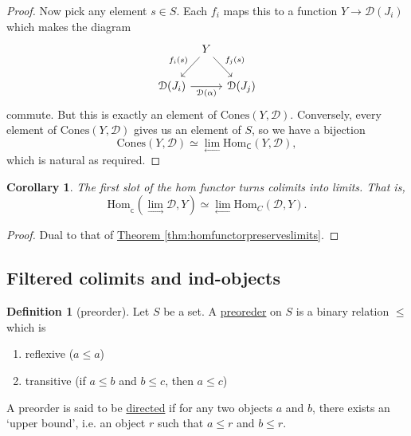 \documentclass[a4paper]{report}
\newcommand{\defn}[1]{\ul{#1}}
\newcommand{\Hom}{\mathrm{Hom}}
\theoremstyle{definition}
\newtheorem{definition}{Definition}[section]
\theoremstyle{plain}
\newtheorem{corollary}{Corollary}[section]
\theoremstyle{remark}
\begin{document}
\begin{proof}
  Now pick any element $s \in S$. Each $f_{i}$ maps this to a function $Y \to \mathcal{D}(J_{i})$ which makes the diagram
  \begin{equation*}
    \begin{tikzcd}[column sep=tiny]
      & Y
      \arrow[dl, swap, "f_{i}(s)"]
      \arrow[dr, "f_{j}(s)"]
      \\
      \mathcal{D}(J_{i})
      \arrow[rr, swap, "\mathcal{D}(\alpha)"]
      & & \mathcal{D}(J_{j})
    \end{tikzcd}
  \end{equation*}
  commute. But this is exactly an element of $\mathrm{Cones}(Y, \mathcal{D})$. Conversely, every element of $\mathrm{Cones}(Y, \mathcal{D})$ gives us an element of $S$, so we have a bijection 
  \begin{equation*}
    \mathrm{Cones}(Y, \mathcal{D}) \simeq \lim_{\leftarrow} \Hom_{\mathsf{C}}(Y, \mathcal{D}),
  \end{equation*}
  which is natural as required.
\end{proof}

\begin{corollary}
  The first slot of the hom functor turns colimits into limits. That is, 
  \begin{equation*}
    \Hom_{_\mathsf{C}}(\lim_{\rightarrow}\mathcal{D}, Y) \simeq \lim_{\leftarrow}\Hom_{C}(\mathcal{D}, Y).
  \end{equation*}
\end{corollary}
\begin{proof}
  Dual to that of \hyperref[thm:homfunctorpreserveslimits]{Theorem \ref*{thm:homfunctorpreserveslimits}}.
\end{proof}


\subsection{Filtered colimits and ind-objects}
\begin{definition}[preorder]
  \label{def:preorder}
  Let $S$ be a set. A \defn{preoreder} on $S$ is a binary relation $\leq$ which is 
  \begin{enumerate}
    \item reflexive ($a \leq a$)

    \item transitive (if $a \leq b$ and $b \leq c$, then $a \leq c$)
  \end{enumerate}

  A preorder is said to be \defn{directed} if for any two objects $a$ and $b$, there exists an `upper bound', i.e. an object $r$ such that $a \leq r$ and $b \leq r$.
\end{definition}
\end{document}
